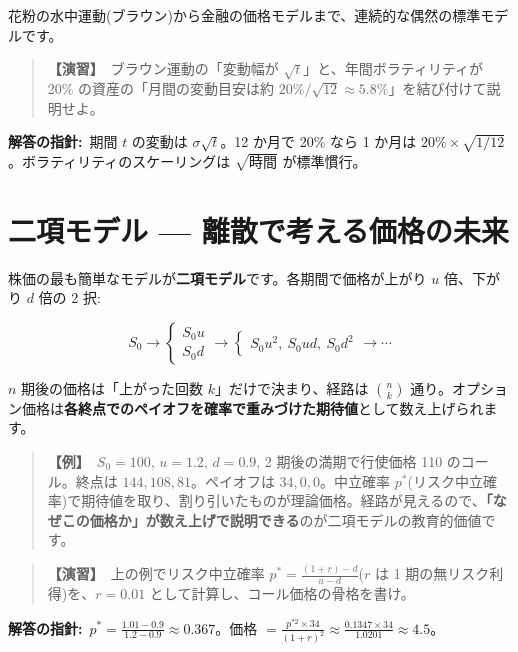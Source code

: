 \documentclass{article}
\begin{document}
花粉の水中運動(ブラウン)から金融の価格モデルまで、連続的な偶然の標準モデルです。

\begin{quote}
\textbf{【演習】}\ ブラウン運動の「変動幅が \(\sqrt{t}\)」と、年間ボラティリティが 20\% の資産の「月間の変動目安は約 \(20\%/\sqrt{12} \approx 5.8\%\)」を結び付けて説明せよ。
\end{quote}

\textbf{解答の指針:}\ 期間 \(t\) の変動は \(\sigma\sqrt{t}\)。12 か月で 20\% なら 1 か月は \(20\% \times \sqrt{1/12}\)。ボラティリティのスケーリングは \(\sqrt{\text{時間}}\) が標準慣行。

\section{二項モデル — 離散で考える価格の未来}

株価の最も簡単なモデルが\textbf{二項モデル}です。各期間で価格が上がり \(u\) 倍、下がり \(d\) 倍の 2 択:

\[ S_0 \to \begin{cases} S_0 u \\ S_0 d \end{cases} \to \begin{cases} S_0 u^2,\ S_0 ud,\ S_0 d^2 \end{cases} \to \cdots \]

\(n\) 期後の価格は「上がった回数 \(k\)」だけで決まり、経路は \(\binom{n}{k}\) 通り。オプション価格は\textbf{各終点でのペイオフを確率で重みづけた期待値}として数え上げられます。

\begin{quote}
\textbf{【例】}\ \(S_0 = 100\), \(u = 1.2\), \(d = 0.9\), 2 期後の満期で行使価格 110 のコール。終点は \(144, 108, 81\)。ペイオフは \(34, 0, 0\)。中立確率 \(p^*\)(リスク中立確率)で期待値を取り、割り引いたものが理論価格。経路が見えるので、\textbf{「なぜこの価格か」が数え上げで説明できる}のが二項モデルの教育的価値です。
\end{quote}

\begin{quote}
\textbf{【演習】}\ 上の例でリスク中立確率 \(p^* = \frac{(1+r) - d}{u - d}\)(\(r\) は 1 期の無リスク利得)を、\(r = 0.01\) として計算し、コール価格の骨格を書け。
\end{quote}

\textbf{解答の指針:}\ \(p^* = \frac{1.01 - 0.9}{1.2 - 0.9} \approx 0.367\)。価格 \(= \frac{p^{*2} \times 34}{(1+r)^2} \approx \frac{0.1347 \times 34}{1.0201} \approx 4.5\)。
\end{document}
